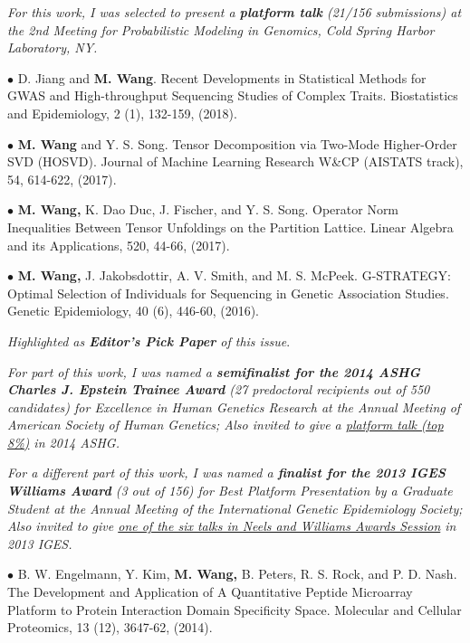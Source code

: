 \documentclass[letterpaper]{article}
\renewenvironment{itemize}{
  \begin{list}{}{
    \setlength{\leftmargin}{1.5em}
  }
}{
  \end{list}
}
\begin{document}
\begin{itemize}
{\it For this work, I was selected to present a \emph{\bf platform talk} (21/156 submissions) at the 2nd Meeting for Probabilistic Modeling in Genomics, Cold Spring Harbor Laboratory, NY.}

\item$\bullet$ D. Jiang and {\bf M. Wang}. Recent Developments in Statistical Methods for GWAS and High-throughput Sequencing Studies of Complex Traits. Biostatistics and Epidemiology, 2 (1), 132-159, (2018).

\item$\bullet$  {\bf M. Wang} and Y. S. Song. Tensor Decomposition via Two-Mode Higher-Order SVD (HOSVD). Journal of Machine Learning Research W\&CP (AISTATS track), 54, 614-622, (2017).

\item$\bullet$ {\bf M. Wang,} K. Dao Duc, J. Fischer, and Y. S. Song. Operator Norm Inequalities Between Tensor Unfoldings on the Partition Lattice. Linear Algebra and its Applications, 520, 44-66, (2017).

\item$\bullet$  {\bf M. Wang,} J. Jakobsdottir, A. V. Smith, and M. S. McPeek. G-STRATEGY: Optimal Selection of Individuals for Sequencing in Genetic Association Studies. Genetic Epidemiology, 40 (6), 446-60, (2016).

\vspace{.1cm}
{\it Highlighted as {\bf Editor's Pick Paper} of this issue}.
\vspace{.1cm}

{\it For part of this work, I was named a {\bf semifinalist for the 2014 ASHG Charles J. Epstein Trainee
Award} (27 predoctoral recipients out of 550 candidates) for Excellence in Human Genetics Research at the Annual Meeting of American Society of Human Genetics; Also invited to give a \underline{platform talk (top 8\%)} in 2014 ASHG.}


{\it For a different part of this work, I was named a {\bf finalist for the 2013 IGES Williams Award} (3 out of 156) for
Best Platform Presentation by a Graduate Student at the Annual Meeting of the International Genetic Epidemiology Society; Also invited to give \underline{one of the six talks in Neels and Williams Awards Session} in 2013 IGES.}


\item$\bullet$  B. W. Engelmann, Y. Kim, {\bf M. Wang,} B. Peters, R. S. Rock, and P. D. Nash. The Development and Application of A Quantitative Peptide Microarray Platform to Protein Interaction Domain Specificity Space. Molecular and Cellular Proteomics, 13 (12), 3647-62, (2014).
\end{itemize}
\end{document}

